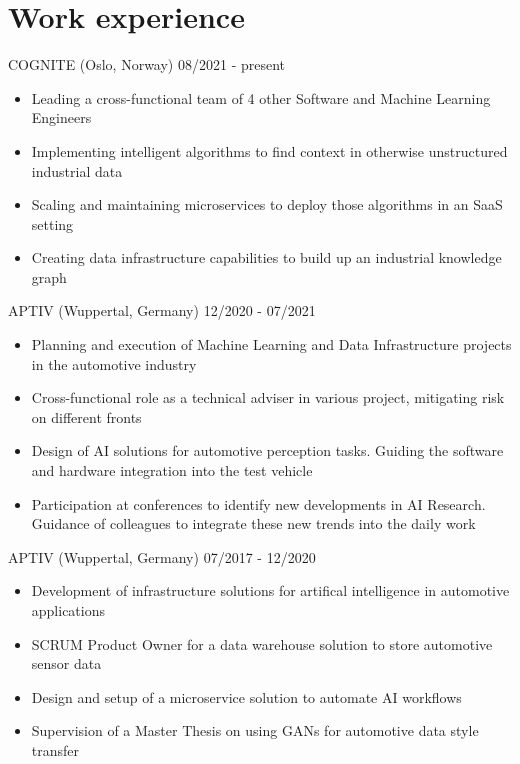 \documentclass[singlesided,
               paper=a4,
               fontsize=10pt
              ]{my-resume}
\begin{document}
\section[\faBriefcase]{Work experience}
	{COGNITE (Oslo, Norway)}
	{08/2021 - present}
    {\begin{itemize}[leftmargin=2em]
        \item Leading a cross-functional team of 4 other Software and Machine Learning Engineers
        \item Implementing intelligent algorithms to find context in otherwise unstructured industrial data
        \item Scaling and maintaining microservices to deploy those algorithms in an SaaS setting
        \item Creating data infrastructure capabilities to build up an industrial knowledge graph
    \end{itemize}}
%
    {APTIV (Wuppertal, Germany)}
    {12/2020 - 07/2021}
    {\begin{itemize}[leftmargin=2em]
        \item Planning and execution of Machine Learning and Data Infrastructure projects in the automotive industry
        \item Cross-functional role as a technical adviser in various project, mitigating risk on different fronts
        \item Design of AI solutions for automotive perception tasks. Guiding the software and hardware integration into the test vehicle
        \item Participation at conferences to identify new developments in AI Research. Guidance of colleagues to integrate these new trends into the daily work
    \end{itemize}}
%
    {APTIV (Wuppertal, Germany)}
    {07/2017 - 12/2020}
    {\begin{itemize}[leftmargin=2em]
        \item Development of infrastructure solutions for artifical intelligence in automotive applications 
        \item SCRUM Product Owner for a data warehouse solution to store automotive sensor data 
        \item Design and setup of a microservice solution to automate AI workflows
        \item Supervision of a Master Thesis on using GANs for automotive data style transfer
    \end{itemize}}
\end{document}

